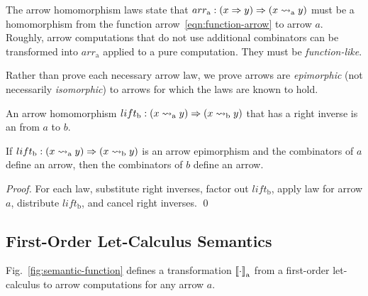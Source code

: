 \documentclass{llncs}
\newcommand{\figref}[1]{Fig.~\ref{#1}}
\newcommand{\arrow}{\rightsquigarrow}
\newcommand{\arrowlift}{\ensuremath{lift}}
\newcommand{\arrowarr}{\ensuremath{arr}}
\newcommand{\gen}{_\mathrm{a}}
\newcommand{\genb}{_\mathrm{b}}
\begin{document}
The arrow homomorphism laws state that $\arrowarr\gen : (x \tto y) \tto (x \arrow\gen y)$ must be a homomorphism from the function arrow~\eqref{eqn:function-arrow} to arrow $a$.
Roughly, arrow computations that do not use additional combinators can be transformed into $\arrowarr\gen$ applied to a pure computation.
They must be \emph{function-like}.

Rather than prove each necessary arrow law, we prove arrows are \emph{epimorphic} (not necessarily \emph{isomorphic}) to arrows for which the laws are known to hold.

\begin{definition}
\label{def:arrow-epimorphism}
An arrow homomorphism $\arrowlift\genb : (x \arrow\gen y) \tto (x \arrow\genb y)$ that has a right inverse is an  from $a$ to $b$.
\end{definition}

\begin{theorem}
\label{thm:arrow-epimorphism}
If $\arrowlift\genb : (x \arrow\gen y) \tto (x \arrow\genb y)$ is an arrow epimorphism and the combinators of $a$ define an arrow, then the combinators of $b$ define an arrow.
\end{theorem}
\begin{proof}
For each law, substitute right inverses, factor out $\arrowlift\genb$, apply law for arrow $a$, distribute $\arrowlift\genb$, and cancel right inverses.
\qed
\end{proof}



\subsection{First-Order Let-Calculus Semantics}

\figref{fig:semantic-function} defines a transformation $\meaningof{\cdot}\gen$ from a first-order let-calculus to arrow computations for any arrow $a$.
\end{document}
